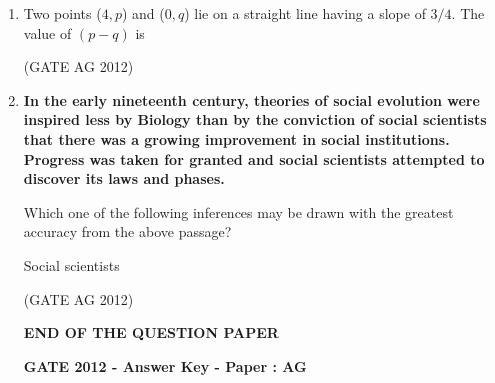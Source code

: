 \documentclass[journal]{IEEEtran}
\begin{document}
\begin{enumerate}
\medskip

\item
 Two points ($4, p$) and ($0, q$) lie on a straight line having a slope of $3/4$. The value of $(p - q)$ is
\begin{enumerate}
\end{enumerate}
\hfill(GATE AG 2012)\\

\medskip

\item
 \textbf{In the early nineteenth century, theories of social evolution were inspired less by Biology than by the conviction of social scientists that there was a growing improvement in social institutions. Progress was taken for granted and social scientists attempted to discover its laws and phases.}

Which one of the following inferences may be drawn with the greatest accuracy from the above passage?

Social scientists
\begin{enumerate}
\end{enumerate}
\hfill(GATE AG 2012)\\

\medskip

\begin{center}
\textbf{END OF THE QUESTION PAPER}
\end{center}

\begin{center}
    \textbf{GATE 2012 - Answer Key - Paper : AG}
\end{center}



\medskip



\end{enumerate}
\end{document}
